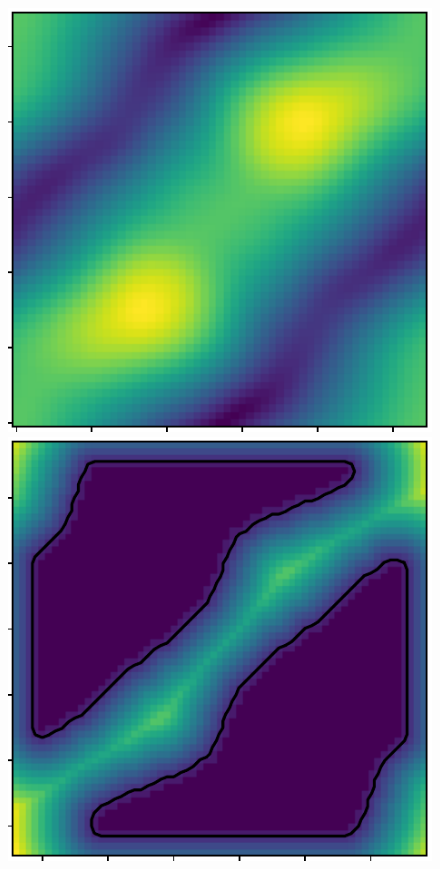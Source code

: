 \begin{figure}[htbp]
\centering
    \includegraphics[scale=0.85]{figures/hsn_field.pdf}\hspace{0.5in}
    \includegraphics[scale=0.8]{figures/hsn_boundary.pdf}
    \caption{}
    \label{fig:hsn}
\end{figure}

